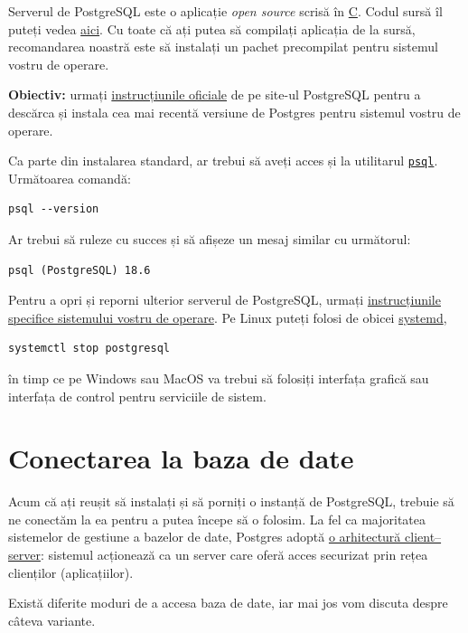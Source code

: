 \documentclass[a4paper, 12pt]{article}
\begin{document}
Serverul de PostgreSQL este o aplicație \emph{open source} scrisă în \href{https://en.wikipedia.org/wiki/C_(programming_language)}{C}. Codul sursă îl puteți vedea \href{https://github.com/postgres/postgres}{aici}. Cu toate că ați putea să compilați aplicația de la sursă, recomandarea noastră este să instalați un pachet precompilat pentru sistemul vostru de operare.

\textbf{Obiectiv:} urmați \href{https://www.postgresql.org/download/}{instrucțiunile oficiale} de pe site-ul PostgreSQL pentru a descărca și instala cea mai recentă versiune de Postgres pentru sistemul vostru de operare.

Ca parte din instalarea standard, ar trebui să aveți acces și la utilitarul \href{https://www.postgresql.org/docs/current/app-psql.html}{\texttt{psql}}. Următoarea comandă:

\begin{verbatim}
psql --version
\end{verbatim}

Ar trebui să ruleze cu succes și să afișeze un mesaj similar cu următorul:

\begin{verbatim}
psql (PostgreSQL) 18.6
\end{verbatim}

Pentru a opri și reporni ulterior serverul de PostgreSQL, urmați \href{https://stackoverflow.com/q/45671327/5723188}{instrucțiunile specifice sistemului vostru de operare}. Pe Linux puteți folosi de obicei \href{https://systemd.io/}{systemd},
\begin{verbatim}
systemctl stop postgresql
\end{verbatim}
în timp ce pe Windows sau MacOS va trebui să folosiți interfața grafică sau interfața de control pentru serviciile de sistem.

\section{Conectarea la baza de date}

Acum că ați reușit să instalați și să porniți o instanță de PostgreSQL, trebuie să ne conectăm la ea pentru a putea începe să o folosim. La fel ca majoritatea sistemelor de gestiune a bazelor de date, Postgres adoptă \href{https://en.wikipedia.org/wiki/Client%E2%80%93server_model}{o arhitectură client--server}: sistemul acționează ca un server care oferă acces securizat prin rețea clienților (aplicațiilor).

Există diferite moduri de a accesa baza de date, iar mai jos vom discuta despre câteva variante.
\end{document}
